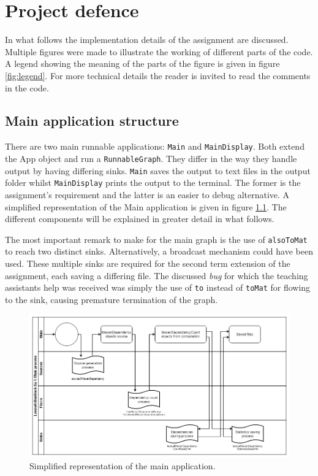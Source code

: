 \chapter{Project defence}
\label{ch:project_defence}

In what follows the implementation details of the assignment are discussed.
Multiple figures were made to illustrate the working of different parts of the code.
A legend showing the meaning of the parts of the figure is given in figure \ref{fig:legend}.
For more technical details the reader is invited to read the comments in the code.


\section{Main application structure}
\label{sec:main_app_structure}

There are two main runnable applications: \texttt{Main} and \texttt{MainDisplay}. 
Both extend the App object and run a \texttt{RunnableGraph}.
They differ in the way they handle output by having differing sinks.
\texttt{Main} saves the output to text files in the output folder whilst \texttt{MainDisplay} prints the output to the terminal.
The former is the assignment's requirement and the latter is an easier to debug alternative.
A simplified representation of the Main application is given in figure \ref{fig:main}.
The different components will be explained in greater detail in what follows.

The most important remark to make for the main graph is the use of \texttt{alsoToMat} to reach two distinct sinks.
Alternatively, a broadcast mechanism could have been used.
These multiple sinks are required for the second term extension of the assignment, each saving a differing file.
The discussed \textit{bug} for which the teaching assistants help was received was simply the use of \texttt{to} instead of \texttt{toMat} for flowing to the sink, causing premature termination of the graph.  

\begin{figure}[H]
    \centering
    \includegraphics[width=0.8\linewidth]{images/main.png}
    \captionsetup{width=0.7\linewidth}
    \captionsetup{justification=centering}
    \caption{Simplified representation of the main application.  }
    \label{fig:main}
\end{figure}





